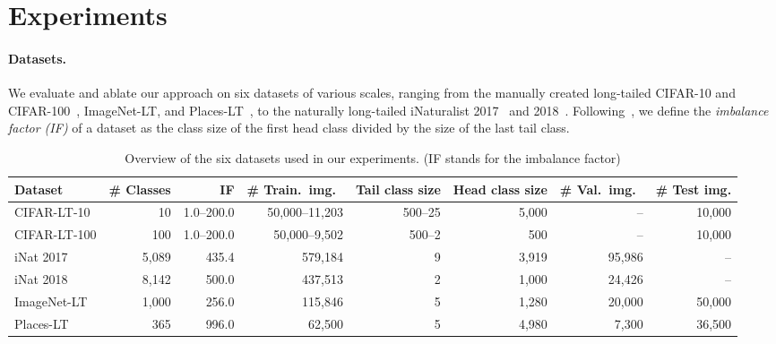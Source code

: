 \section{Experiments}\label{sExps}

\paragraph{Datasets.}
We evaluate and ablate our approach on six datasets of various scales, ranging from the manually created long-tailed CIFAR-10 and CIFAR-100~\cite{CBLoss},  ImageNet-LT, and Places-LT~\cite{OLTR}, to the naturally long-tailed iNaturalist 2017~\cite{inaturalist2017} and 2018~\cite{inaturalist}. Following~\cite{CBLoss},  we define the \emph{imbalance factor (IF)} of a dataset as the class size of the first head class divided by the size of the last tail class.

\begin{table*}
\centering
\small
\caption {\label{tab:datasets} Overview of the six datasets used in our experiments. (IF stands for the imbalance factor)}
\vspace{2pt}
\begin{tabular}{l|r|r|r|r|r|r|r}
\hline
Dataset & \# Classes & IF & \# Train.\ img.\ & Tail class size & Head class size  & \# Val.\ img.\  & \# Test img.\\ \hline
CIFAR-LT-10\cut{~\cite{Krizhevsky-CIFAR,CBLoss}} & 10 & 1.0--200.0 & 50,000--11,203 & 500--25  & 5,000 & -- & 10,000\\ \hline
CIFAR-LT-100\cut{~\cite{Krizhevsky-CIFAR,CBLoss}} & 100 & 1.0--200.0 & 50,000--9,502  & 500--2 & 500 & -- & 10,000 \\ \hline
iNat 2017\cut{~\cite{inaturalist2017}} & 5,089 & 435.4 & 579,184 & 9 & 3,919 & 95,986 & -- \\ \hline
iNat 2018\cut{~\cite{inaturalist}} & 8,142 & 500.0 & 437,513 & 2 &  1,000 & 24,426 & -- \\ \hline
ImageNet-LT\cut{~\cite{ImageNet,OLTR}} & 1,000 & 256.0 & 115,846 & 5 & 1,280 & 20,000 & 50,000 \\ \hline
Places-LT\cut{~\cite{Places2,OLTR}} & 365 & 996.0 & 62,500 & 5 & 4,980 & 7,300 & 36,500 \\ \hline
\end{tabular}
\vspace{-10pt}
\end{table*}

